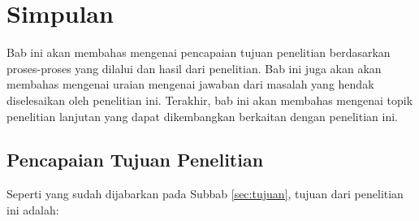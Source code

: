 \chapter{Simpulan}
\label{chap:simpulan}

Bab ini akan membahas mengenai pencapaian tujuan penelitian berdasarkan proses-proses yang dilalui dan hasil dari penelitian. Bab ini juga akan akan membahas mengenai uraian mengenai jawaban dari masalah yang hendak diselesaikan oleh penelitian ini. Terakhir, bab ini akan membahas mengenai topik penelitian lanjutan yang dapat dikembangkan berkaitan dengan penelitian ini.

\section{Pencapaian Tujuan Penelitian}
\label{sec:pencapaian-tujuan}

Seperti yang sudah dijabarkan pada Subbab \ref{sec:tujuan}, tujuan dari penelitian ini adalah:


